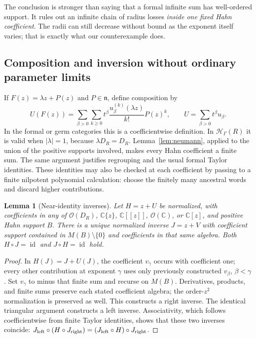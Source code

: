 \documentclass[11pt,a4paper]{article}
\numberwithin{equation}{section}
\newtheorem{lemma}[theorem]{Lemma}
\theoremstyle{definition}
\theoremstyle{remark}
\newcommand{\C}{\mathbb C}
\newcommand{\HH}{\mathcal H}
\newcommand{\nn}{\mathfrak n}
\newcommand{\id}{\operatorname{id}}
\begin{document}
The conclusion is stronger than saying that a formal infinite sum has
well-ordered support. It rules out an infinite chain of radius losses
\emph{inside one fixed Hahn coefficient}. The radii can still decrease
without bound as the exponent itself varies; that is exactly what our
counterexample does.

\subsection{Composition and inversion without ordinary parameter limits}

If $F(z)=\lambda z+P(z)$ and $P\in\nn$, define composition by
\begin{equation}\label{eq:taylorcomposition}
 U(F(z))=
 \sum_{\beta>0}\sum_{k\ge0}
 t^\beta\frac{u_\beta^{(k)}(\lambda z)}{k!}P(z)^k,
 \qquad U=\sum_{\beta>0}t^\beta u_\beta.
\end{equation}
In the formal or germ categories this is a coefficientwise definition. In
$\HH_\Gamma(R)$ it is valid when $|\lambda|=1$, because
$\lambda D_R=D_R$. Lemma~\ref{lem:neumann}, applied to the union of the
positive supports involved, makes every Hahn coefficient a finite sum.
The same argument justifies regrouping and the usual formal Taylor
identities. These identities may also be checked at each coefficient by
passing to a finite nilpotent polynomial calculation: choose the finitely
many ancestral words and discard higher contributions.

\begin{lemma}[Near-identity inverses]\label{lem:inverse}
Let $H=z+U$ be normalized, with coefficients in any of
$\mathcal O(D_R)$, $\C\{z\}$, $\C[[z]]$, $\mathcal O(\C)$, or $\C[z]$,
and positive Hahn support $B$. There is a unique normalized inverse
$J=z+V$ with coefficient support contained in $M(B)\setminus\{0\}$ and
coefficients in that same algebra. Both $H\circ J=\id$ and
$J\circ H=\id$ hold.
\end{lemma}

\begin{proof}
In $H(J)=J+U(J)$, the coefficient $v_\gamma$ occurs with coefficient one;
every other contribution at exponent $\gamma$ uses only previously
constructed $v_\beta$, $\beta<\gamma$. Set $v_\gamma$ to minus that
finite sum and recurse on $M(B)$. Derivatives, products, and finite sums
preserve each stated coefficient algebra; the order-$z^2$ normalization
is preserved as well. This constructs a right inverse. The identical
triangular argument constructs a left inverse. Associativity, which
follows coefficientwise from finite Taylor identities, shows that these
two inverses coincide: $J_{\rm left}\circ(H\circ J_{\rm right})=
(J_{\rm left}\circ H)\circ J_{\rm right}$.
\end{proof}
\end{document}
